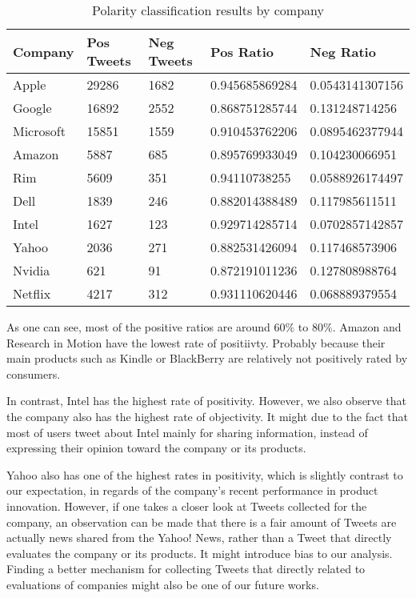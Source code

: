 \documentclass[12pt]{article}
\begin{document}
\begin{table}
\begin{center}
    \begin{tabular}{ | l || l | l | l | l | }
        \hline
        \textbf{Company} &  \textbf{Pos Tweets} & \textbf{Neg Tweets} & \textbf{Pos Ratio} & \textbf{Neg Ratio} \\ \hline
        \hline
        Apple &  29286 & 1682 & 0.945685869284 & 0.0543141307156 \\ \hline
        Google &  16892 & 2552 & 0.868751285744 & 0.131248714256 \\ \hline
        Microsoft &  15851 & 1559 & 0.910453762206 & 0.0895462377944 \\ \hline
        Amazon &  5887 & 685 & 0.895769933049 & 0.104230066951 \\ \hline
        Rim &  5609 & 351 & 0.94110738255 & 0.0588926174497 \\ \hline
        Dell &  1839 & 246 & 0.882014388489 & 0.117985611511 \\ \hline
        Intel &  1627 & 123 & 0.929714285714 & 0.0702857142857 \\ \hline
        Yahoo &  2036 & 271 & 0.882531426094 & 0.117468573906 \\ \hline
        Nvidia &  621 & 91 & 0.872191011236 & 0.127808988764 \\ \hline
        Netflix &  4217 & 312 & 0.931110620446 & 0.068889379554 \\ \hline
    \end{tabular}
\caption{Polarity classification results by company}
\label{polarity-by-company}
\end{center}
\end{table}

As one can see, most of the positive ratios are around $60\%$ to $80\%$. Amazon and Research in Motion have the lowest rate of positiivty. Probably because their main products such as Kindle or BlackBerry are relatively not positively rated by consumers. 

In contrast, Intel has the highest rate of positivity. However, we also observe that the company also has the highest rate of objectivity. It might due to the fact that most of users tweet about Intel mainly for sharing information, instead of expressing their opinion toward the company or its products.

Yahoo also has one of the highest rates in positivity, which is slightly contrast to our expectation, in regards of the company's recent performance in product innovation. However, if one takes a closer look at Tweets collected for the company, an observation can be made that there is a fair amount of Tweets are actually news shared from the Yahoo! News, rather than a Tweet that directly evaluates the company or its products. It might introduce bias to our analysis. Finding a better mechanism for collecting Tweets that directly related to evaluations of companies might also be one of our future works.
\end{document}
